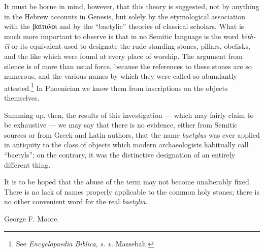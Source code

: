 \documentclass[a4paper, 12pt, oneside, polutonikogreek, english]{article}
\begin{document}
It must be borne in mind, however, that this theory is suggested, not by anything in the Hebrew accounts in Genesis, but solely by the etymological association with the βαίτυλοι and by the ``baetylic'' theories of classical scholars. What is much more important to observe is that in no Semitic language is the word \emph{bēth-ēl} or its equivalent used to designate the rude standing stones, pillars, obelisks, and the like which were found at every place of worship. The argument from silence is of more than usual force, because the references to these stones are so numerous, and the various names by which they were called so abundantly attested.\footnote{See \emph{Encyclopaedia Biblica}, \emph{s. v.} Massebah.} In Phoenician we know them from inscriptions on the objects themselves.

Summing up, then, the results of this investigation --- which may fairly claim to be exhaustive --- we may say that there is no evidence, either from Semitic sources or from Greek and Latin authors, that the name \emph{baetylus} was ever applied in antiquity to the class of objects which modern archaeologists habitually call ``baetyls''; on the contrary, it was the distinctive designation of an entirely different thing.

It is to be hoped that the abuse of the term may not become unalterably fixed. There is no lack of names properly applicable to the common holy stones; there is no other convenient word for the real \emph{baetylia}.

\bigskip

George F. Moore.
\end{document}
